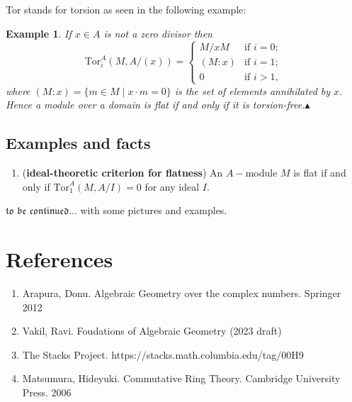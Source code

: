 \documentclass[12pt]{article}
\theoremstyle{mytheoremstyle}
\newtheorem{example}{Example}
\newcommand{\tor}{\text{Tor}}
\begin{document}
Tor stands for torsion as seen in the following example:
\begin{example}
    If $x\in A$ is not a zero divisor then
    $$\tor^A_i(M,A/(x))=\begin{cases}
        M/xM & \text{if } i=0;\\
        (M:x) & \text{if } i=1;\\
        0 & \text{if } i>1,
    \end{cases}$$
    where $(M:x)=\{m\in M\mid x\cdot m=0\}$ is the set of elements
    annihilated by $x$. Hence a module over a domain is flat if and
    only if it is torsion-free.$\blacktriangle$
\end{example}

\subsection{Examples and facts}
\begin{enumerate}
    \item (\textbf{ideal-theoretic criterion for flatness}) An
    $A-$module $M$ is flat if and only if $\tor^A_1(M,A/I)=0$
    for any ideal $I$.
\end{enumerate}

$\mathfrak{to}$ $\mathfrak{be}$ $\mathfrak{continued}...$ with
some pictures and examples.

\newpage
\section*{References}
\begin{enumerate}
    \item Arapura, Donu. Algebraic Geometry over the complex numbers. Springer 2012
    \item Vakil, Ravi. Foudations of Algebraic Geometry (2023 draft)
    \item The Stacks Project. https://stacks.math.columbia.edu/tag/00H9
    \item Matsumura, Hideyuki. Commutative Ring Theory. Cambridge University Press. 2006
\end{enumerate}

\setcounter{section}{1}
\setcounter{theorem}{1}
\end{document}
